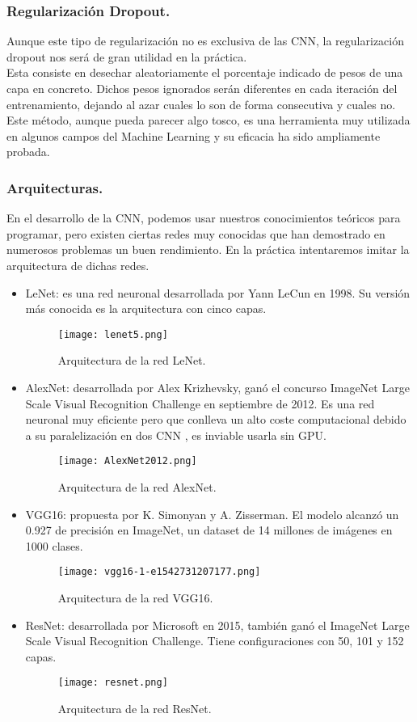 \documentclass[a4paper,11pt]{article}
\begin{document}
\subsubsection{Regularización Dropout.}
Aunque este tipo de regularización no es exclusiva de las CNN, la regularización dropout nos será de gran utilidad en la práctica. \\

\noindent
Esta consiste en desechar aleatoriamente el porcentaje indicado de pesos de una capa en concreto. Dichos pesos ignorados serán diferentes en cada iteración del entrenamiento, dejando al azar cuales lo son de forma consecutiva y cuales no.\\ 

\noindent
Este método, aunque pueda parecer algo tosco, es una herramienta muy utilizada en algunos campos del Machine Learning y su eficacia ha sido ampliamente probada.
\subsubsection{Arquitecturas.}
En el desarrollo de la CNN, podemos usar nuestros conocimientos teóricos para programar, pero existen ciertas redes muy conocidas que han demostrado en numerosos problemas un buen rendimiento. En la práctica intentaremos imitar la arquitectura de dichas redes.
\begin{itemize}
\item LeNet: es una red neuronal desarrollada por Yann LeCun en 1998. Su versión más conocida es la arquitectura con cinco capas. \begin{figure}[H]
\centering
\texttt{[image: lenet5.png]}
\caption{Arquitectura de la red LeNet.}
\end{figure}
\item AlexNet: desarrollada por Alex Krizhevsky, ganó el concurso ImageNet Large Scale Visual Recognition Challenge en septiembre de 2012. Es una red neuronal muy eficiente pero que conlleva un alto coste computacional debido a su paralelización en dos CNN , es inviable usarla sin GPU.\begin{figure}[H]
\centering
\texttt{[image: AlexNet2012.png]}
\caption{Arquitectura de la red AlexNet.}
\end{figure}
\item VGG16: propuesta por K. Simonyan y A. Zisserman. El modelo alcanzó un 0.927 de precisión en ImageNet, un dataset de 14 millones de imágenes en 1000 clases. \begin{figure}[H]
\centering
\texttt{[image: vgg16-1-e1542731207177.png]}
\caption{Arquitectura de la red VGG16.}
\end{figure} 	
\item ResNet: desarrollada por Microsoft en 2015, también ganó el ImageNet Large Scale Visual Recognition Challenge. Tiene configuraciones con 50, 101 y 152 capas.\begin{figure}[H]
\centering
\texttt{[image: resnet.png]}
\caption{Arquitectura de la red ResNet.}
\end{figure} 	
\end{itemize}
\end{document}
